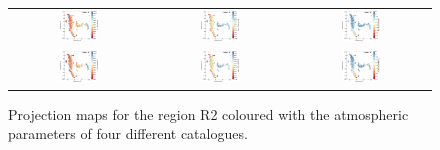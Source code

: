 \documentclass{aa}
\begin{document}
\begin{appendix}
\begin{figure}[htbp]
\begin{tabular}{ccc}
        \includegraphics[width=0.3\textwidth]{Plots/tsne_params/tsne_R2_Teff_StarHorse2.pdf} &
        \includegraphics[width=0.3\textwidth]{Plots/tsne_params/tsne_R2_logg_StarHorse2.pdf} &
        \includegraphics[width=0.3\textwidth]{Plots/tsne_params/tsne_R2_FeH_StarHorse2.pdf} \\
        \includegraphics[width=0.3\textwidth]{Plots/tsne_params/tsne_R2_Teff_XP-LAMOST.pdf} &
        \includegraphics[width=0.3\textwidth]{Plots/tsne_params/tsne_R2_logg_XP-LAMOST.pdf} &
        \includegraphics[width=0.3\textwidth]{Plots/tsne_params/tsne_R2_FeH_XP-LAMOST.pdf} \\
    \end{tabular}
    \caption{Projection maps for the region R2 coloured with the atmospheric parameters of four different catalogues.}
\end{figure}


\end{appendix}
\end{document}
